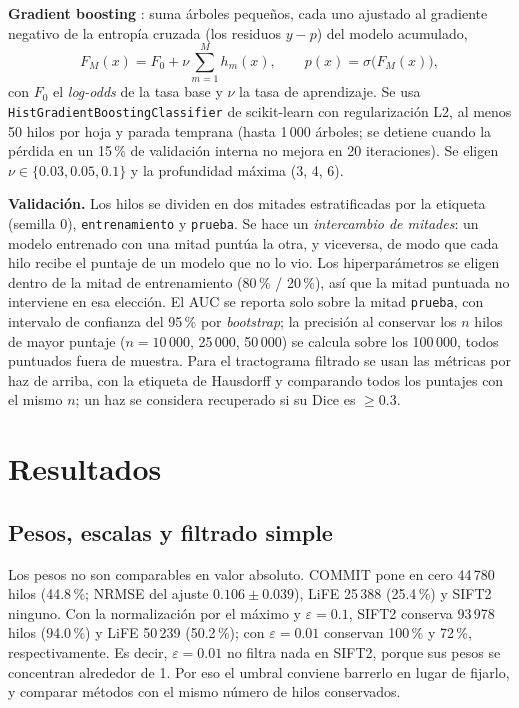 \documentclass[11pt,a4paper]{article}
\newcommand{\code}[1]{\texttt{\small #1}}
\newcommand{\eps}{\varepsilon}
\begin{document}
\textbf{Gradient boosting} \cite{friedman2001}: suma \'arboles peque\~nos, cada uno
ajustado al gradiente negativo de la entrop\'ia cruzada (los residuos $y-p$) del modelo
acumulado,
\begin{equation}
  F_M(x)=F_0+\nu\sum_{m=1}^{M}h_m(x),\qquad p(x)=\sigma\big(F_M(x)\big),
\end{equation}
con $F_0$ el \textit{log-odds} de la tasa base y $\nu$ la tasa de aprendizaje. Se usa
\code{HistGradientBoostingClassifier} de scikit-learn \cite{pedregosa2011} con
regularizaci\'on L2, al menos 50 hilos por hoja y parada temprana (hasta 1\,000 \'arboles; se
detiene cuando la p\'erdida en un 15\,\% de validaci\'on interna no mejora en 20 iteraciones).
Se eligen $\nu\in\{0.03,0.05,0.1\}$ y la profundidad m\'axima (3, 4, 6).

\textbf{Validaci\'on.} Los hilos se dividen en dos mitades estratificadas por la etiqueta
(semilla 0), \code{entrenamiento} y \code{prueba}. Se hace un \emph{intercambio de mitades}:
un modelo entrenado con una mitad punt\'ua la otra, y viceversa, de modo que cada hilo recibe
el puntaje de un modelo que no lo vio. Los hiperpar\'ametros se eligen dentro de la mitad de
entrenamiento (80\,\% / 20\,\%), as\'i que la mitad puntuada no interviene en esa elecci\'on.
El AUC se reporta solo sobre la mitad \code{prueba}, con intervalo de confianza del 95\,\%
por \textit{bootstrap}; la precisi\'on al conservar los $n$ hilos de mayor puntaje
($n=10\,000$, 25\,000, 50\,000) se calcula sobre los 100\,000, todos puntuados fuera de
muestra. Para el tractograma filtrado se usan las m\'etricas por haz de arriba, con la
etiqueta de Hausdorff y comparando todos los puntajes con el mismo $n$; un haz se
considera recuperado si su Dice es $\ge0.3$.


\section{Resultados}
\label{sec:resultados}

\subsection{Pesos, escalas y filtrado simple}

Los pesos no son comparables en valor absoluto. COMMIT pone en cero 44\,780 hilos (44.8\,\%; NRMSE del ajuste $0.106\pm0.039$), LiFE 25\,388 (25.4\,\%) y SIFT2 ninguno. Con la normalizaci\'on por el m\'aximo y $\eps=0.1$, SIFT2 conserva 93\,978 hilos (94.0\,\%) y LiFE 50\,239 (50.2\,\%); con $\eps=0.01$ conservan 100\,\% y 72\,\%, respectivamente. Es decir, $\eps=0.01$ no filtra nada en SIFT2, porque sus pesos se concentran alrededor de 1. Por eso el umbral conviene barrerlo en lugar de fijarlo, y comparar m\'etodos con el mismo
n\'umero de hilos conservados.
\end{document}
